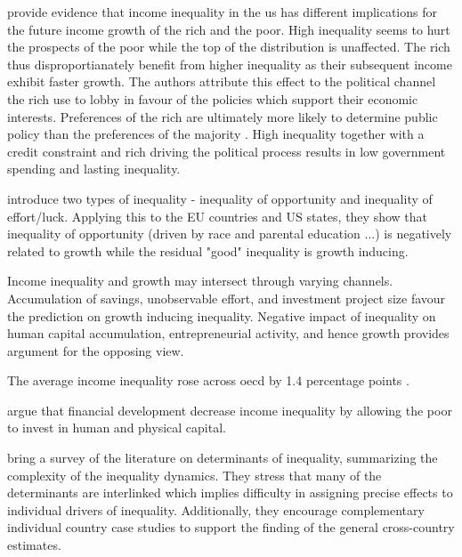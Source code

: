 \documentclass[a4paper,11pt]{article}
\begin{document}
\citet{pikettyandzucman2014}
\citet{van2018inequality} provide evidence that income inequality in the \ac{us} has different implications for the future income growth of the rich and the poor. High inequality seems to hurt the prospects of the poor while the top of the distribution is unaffected. The rich thus disproportianately benefit from higher inequality as their subsequent income exhibit faster growth. The authors attribute this effect to the political channel the rich use to lobby in favour of the policies which support their economic interests. Preferences of the rich are ultimately more likely to determine public policy than the preferences of the majority \citep{gilens_page_2014}. High inequality together with a credit constraint and rich driving the political process results in low government spending and lasting inequality.

\citet{marrero2013inequality} introduce two types of inequality - inequality of opportunity and inequality of effort/luck. Applying this to the EU countries and US states, they show that inequality of opportunity (driven by race and parental education ...) is negatively related to growth while the residual "good" inequality is growth inducing.

Income inequality and growth may intersect through varying channels. Accumulation of savings, unobservable effort, and investment project size favour the prediction on growth inducing inequality. Negative impact of inequality on human capital accumulation, entrepreneurial activity, and hence growth provides argument for the opposing view.

The average income inequality rose across \ac{oecd} by 1.4 percentage points \citep{oecd2013crisis}.

\citet{LawSingh2014} argue that financial development decrease income inequality by allowing the poor to invest in human and physical capital.

\citet{nolan2019drivers} bring a survey of the literature on determinants of inequality, summarizing the complexity of the inequality dynamics. They stress that many of the determinants are interlinked which implies difficulty in assigning precise effects to individual drivers of inequality. Additionally, they encourage complementary individual country case studies to support the finding of the general cross-country estimates.
\end{document}
